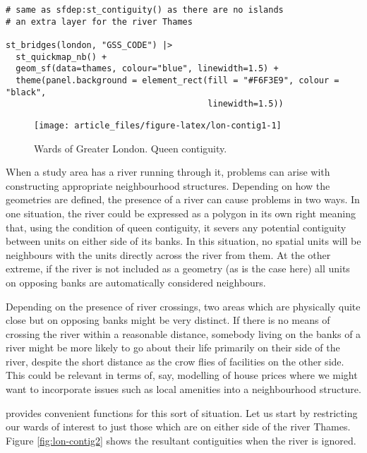 \begin{verbatim}
# same as sfdep:st_contiguity() as there are no islands
# an extra layer for the river Thames

st_bridges(london, "GSS_CODE") |> 
  st_quickmap_nb() + 
  geom_sf(data=thames, colour="blue", linewidth=1.5) + 
  theme(panel.background = element_rect(fill = "#F6F3E9", colour = "black", 
                                        linewidth=1.5))
\end{verbatim}

\begin{figure}

{\centering \texttt{[image: article\_files/figure-latex/lon-contig1-1]} 

}

\caption{Wards of Greater London. Queen contiguity. }\label{fig:lon-contig1}
\end{figure}

When a study area has a river running through it, problems can arise with constructing appropriate neighbourhood structures. Depending on how the
geometries are defined, the presence of a river can cause problems in two ways. In one situation, the river could be expressed as a polygon in its own right meaning that, using the condition of queen contiguity, it severs any potential contiguity between units on either side of its banks. In this situation, no spatial units will be neighbours with the units directly across the river from them. At the other extreme, if the river is not included as a geometry (as is the case here) all units on opposing banks are automatically considered neighbours.

Depending on the presence of river crossings, two areas which are physically quite close but on opposing banks might be very distinct. If there is no means of crossing the river within a reasonable distance, somebody living on the banks of a river might be more likely to go about their life primarily on their side of the river, despite the short distance as the crow flies of facilities on the other side. This could be relevant in terms of, say, modelling of house prices where we might want to incorporate issues such as local amenities into a neighbourhood structure.

 provides convenient functions for this sort of situation. Let us start by restricting our wards of interest to just those which are on either side of the river Thames. Figure \ref{fig:lon-contig2} shows the resultant contiguities when the river is ignored.

